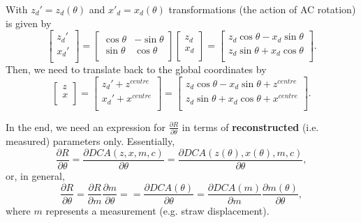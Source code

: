 \documentclass[a4paper,11pt]{article}
\begin{document}
With $z_d'=z_d(\theta)$ and $x'_d=x_d(\theta)$ transformations (the action of AC rotation) is given by
\begin{equation}
\begin{bmatrix}z_d'\\x_d'\\\end{bmatrix}=\begin{bmatrix}\cos \theta &-\sin \theta \\\sin \theta &\cos \theta \\\end{bmatrix} \begin{bmatrix}z_d\\x_d\\\end{bmatrix} = \begin{bmatrix}z_d\cos \theta -x_d\sin \theta \\z_d\sin \theta +x_d\cos \theta \\\end{bmatrix}.
\end{equation}
Then, we need to translate back to the global coordinates by
\begin{equation}
\begin{bmatrix}z\\x\\\end{bmatrix}=\begin{bmatrix}z_d'+z^{centre}\\x_d'+x^{centre}\\\end{bmatrix}=\begin{bmatrix}z_d\cos \theta -x_d\sin \theta + z^{centre} \\z_d\sin \theta +x_d\cos \theta + x^{centre} \\\end{bmatrix}.
\end{equation}

In the end, we need an expression for $\frac{\partial R}{\partial\theta}$ in terms of \textbf{reconstructed} (i.e. measured) parameters only. Essentially, 
\begin{equation}
\frac{\partial R}{\partial\theta} = \frac{\partial DCA(z,x,m,c)}{\partial\theta}= \frac{\partial DCA(z(\theta),x(\theta),m,c)}{\partial\theta},
\end{equation}
or, in general, 
\begin{equation}
\frac{\partial R}{\partial\theta} = \frac{\partial R}{\partial m}\frac{\partial m}{\partial \theta} == \frac{\partial DCA(\theta)}{\partial\theta} = \frac{\partial DCA(m)}{\partial m}\frac{\partial m(\theta)}{\partial \theta},  \label{eq:partialRM}
\end{equation}
where $m$ represents a measurement (e.g. straw displacement).
\end{document}
